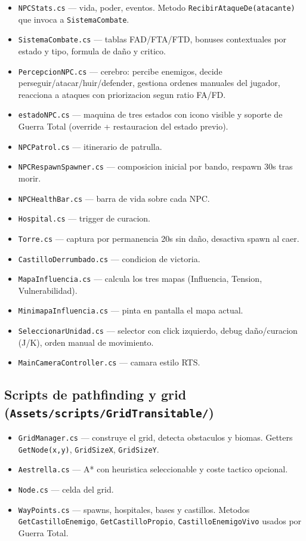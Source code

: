 \documentclass[12pt,a4paper]{article}
\begin{document}
\begin{itemize}[leftmargin=1.5em]
    \item \texttt{NPCStats.cs} — vida, poder, eventos. Metodo \texttt{RecibirAtaqueDe(atacante)} que invoca a \texttt{SistemaCombate}.
    \item \texttt{SistemaCombate.cs} — tablas FAD/FTA/FTD, bonuses contextuales por estado y tipo, formula de daño y critico.
    \item \texttt{PercepcionNPC.cs} — cerebro: percibe enemigos, decide perseguir/atacar/huir/defender, gestiona ordenes manuales del jugador, reacciona a ataques con priorizacion segun ratio FA/FD.
    \item \texttt{estadoNPC.cs} — maquina de tres estados con icono visible y soporte de Guerra Total (override + restauracion del estado previo).
    \item \texttt{NPCPatrol.cs} — itinerario de patrulla.
    \item \texttt{NPCRespawnSpawner.cs} — composicion inicial por bando, respawn 30s tras morir.
    \item \texttt{NPCHealthBar.cs} — barra de vida sobre cada NPC.
    \item \texttt{Hospital.cs} — trigger de curacion.
    \item \texttt{Torre.cs} — captura por permanencia 20s sin daño, desactiva spawn al caer.
    \item \texttt{CastilloDerrumbado.cs} — condicion de victoria.
    \item \texttt{MapaInfluencia.cs} — calcula los tres mapas (Influencia, Tension, Vulnerabilidad).
    \item \texttt{MinimapaInfluencia.cs} — pinta en pantalla el mapa actual.
    \item \texttt{SeleccionarUnidad.cs} — selector con click izquierdo, debug daño/curacion (J/K), orden manual de movimiento.
    \item \texttt{MainCameraController.cs} — camara estilo RTS.
\end{itemize}

\subsection*{Scripts de pathfinding y grid (\texttt{Assets/scripts/GridTransitable/})}

\begin{itemize}[leftmargin=1.5em]
    \item \texttt{GridManager.cs} — construye el grid, detecta obstaculos y biomas. Getters \texttt{GetNode(x,y)}, \texttt{GridSizeX}, \texttt{GridSizeY}.
    \item \texttt{Aestrella.cs} — A* con heuristica seleccionable y coste tactico opcional.
    \item \texttt{Node.cs} — celda del grid.
    \item \texttt{WayPoints.cs} — spawns, hospitales, bases y castillos. Metodos \texttt{GetCastilloEnemigo}, \texttt{GetCastilloPropio}, \texttt{CastilloEnemigoVivo} usados por Guerra Total.
\end{itemize}
\end{document}
